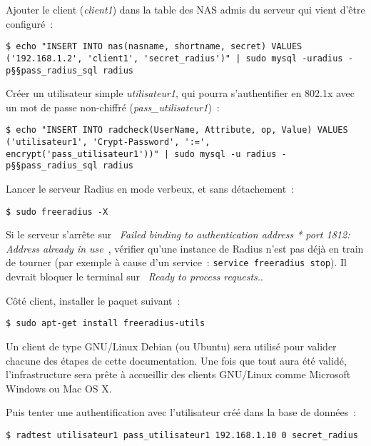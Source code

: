 \label{ajout-nas}
Ajouter le client (\emph{client1}) dans la table des NAS admis du serveur qui vient d'être configuré~:

\begin{lstlisting}
$ echo "INSERT INTO nas(nasname, shortname, secret) VALUES ('192.168.1.2', 'client1', 'secret_radius')" | sudo mysql -uradius -p§§pass_radius_sql radius
\end{lstlisting}

\label{ajout-utilisateur-md5}
Créer un utilisateur simple \emph{utilisateur1}, qui pourra s'authentifier en 802.1x avec un mot de passe non-chiffré (\emph{pass\_utilisateur1})~:

\begin{lstlisting}
$ echo "INSERT INTO radcheck(UserName, Attribute, op, Value) VALUES ('utilisateur1', 'Crypt-Password', ':=', encrypt('pass_utilisateur1'))" | sudo mysql -u radius -p§§pass_radius_sql radius
\end{lstlisting}

\label{freeradius-x}
Lancer le serveur Radius en mode verbeux, et sans détachement~:

\begin{lstlisting}
$ sudo freeradius -X
\end{lstlisting}

Si le serveur s'arrête sur \og~\emph{Failed binding to authentication address * port 1812{}: Address already in use}~\fg{}, vérifier qu'une instance de Radius n'est pas déjà en train de tourner (par exemple à cause d'un service~: \texttt{service freeradius stop}). Il devrait bloquer le terminal sur \og~\emph{Ready to process requests.}\fg{}.

Côté client, installer le paquet suivant~:

\begin{lstlisting}
$ sudo apt-get install freeradius-utils
\end{lstlisting}

{\Large\Info} Un client de type GNU/Linux Debian (ou Ubuntu) sera utilisé pour valider chacune des étapes de cette documentation. Une fois que tout aura été validé, l'infrastructure sera prête à accueillir des clients GNU/Linux comme Microsoft Windows ou Mac OS X.

Puis tenter une authentification avec l'utilisateur créé dans la base de données~:

\begin{lstlisting}
$ radtest utilisateur1 pass_utilisateur1 192.168.1.10 0 secret_radius
\end{lstlisting}

